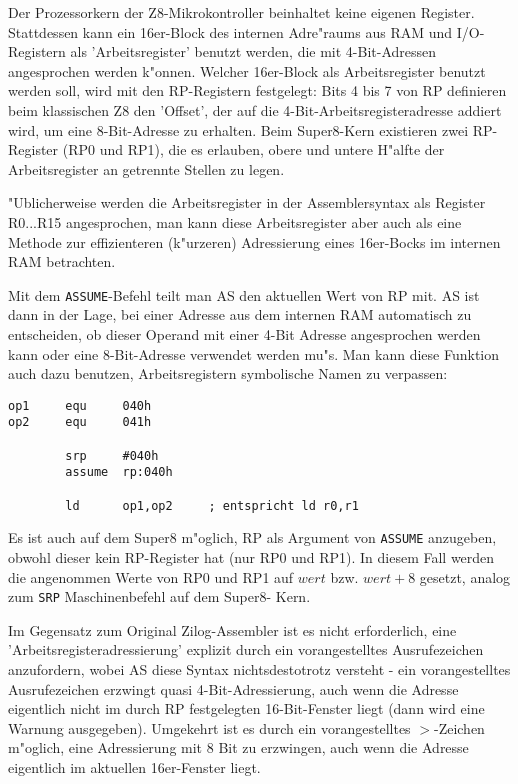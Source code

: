\documentclass[12pt,a4paper,twoside]{report}
\newcommand{\tty}[1]{{\tt #1}}
\begin{document}
Der Prozessorkern der Z8-Mikrokontroller beinhaltet keine eigenen
Register.  Stattdessen kann ein 16er-Block des internen Adre"raums
aus RAM und I/O-Registern als 'Arbeitsregister' benutzt werden, die
mit 4-Bit-Adressen angesprochen werden k"onnen.  Welcher 16er-Block
als Arbeitsregister benutzt werden soll, wird mit den RP-Registern
festgelegt: Bits 4 bis 7 von RP definieren beim klassischen Z8 den
'Offset', der auf die 4-Bit-Arbeitsregisteradresse addiert wird,
um eine 8-Bit-Adresse zu erhalten.  Beim Super8-Kern existieren
zwei RP-Register (RP0 und RP1), die es erlauben, obere und untere
H"alfte der Arbeitsregister an getrennte Stellen zu legen.

"Ublicherweise werden die Arbeitsregister in der Assemblersyntax als
Register R0...R15 angesprochen, man kann diese Arbeitsregister aber
auch als eine Methode zur effizienteren (k"urzeren) Adressierung eines
16er-Bocks im internen RAM betrachten.

Mit dem \tty{ASSUME}-Befehl teilt man AS den aktuellen Wert von RP mit.  AS
ist dann in der Lage, bei einer Adresse aus dem internen RAM
automatisch zu entscheiden, ob dieser Operand mit einer 4-Bit Adresse
angesprochen werden kann oder eine 8-Bit-Adresse verwendet werden
mu"s.  Man kann diese Funktion auch dazu benutzen, Arbeitsregistern
symbolische Namen zu verpassen:
\begin{verbatim}
op1     equ     040h
op2     equ     041h

        srp     #040h
        assume  rp:040h

        ld      op1,op2		; entspricht ld r0,r1
\end{verbatim}
Es ist auch auf dem Super8 m"oglich, RP als Argument von \tty{ASSUME}
anzugeben, obwohl dieser kein RP-Register hat (nur RP0 und RP1).  In
diesem Fall werden die angenommen Werte von RP0 und RP1 auf $wert$ bzw.
$wert+8$ gesetzt, analog zum \tty{SRP} Maschinenbefehl auf dem Super8-
Kern.

Im Gegensatz zum Original Zilog-Assembler ist es nicht erforderlich,
eine 'Arbeitsregisteradressierung' explizit durch ein vorangestelltes
Ausrufezeichen anzufordern, wobei AS diese Syntax nichtsdestotrotz
versteht - ein vorangestelltes Ausrufezeichen erzwingt quasi
4-Bit-Adressierung, auch wenn die Adresse eigentlich nicht im durch
RP festgelegten 16-Bit-Fenster liegt (dann wird eine Warnung
ausgegeben).  Umgekehrt ist es durch ein vorangestelltes $>$-Zeichen
m"oglich, eine Adressierung mit 8 Bit zu erzwingen, auch wenn die
Adresse eigentlich im aktuellen 16er-Fenster liegt.
\end{document}
